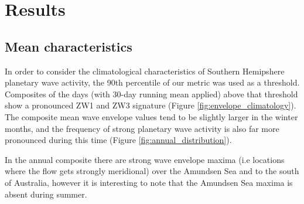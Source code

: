 \section{Results}

\subsection{Mean characteristics}

In order to consider the climatological characteristics of Southern Hemipshere planetary wave activity, the 90th percentile of our metric was used as a threshold. Composites of the days (with 30-day running mean applied) above that threshold show a pronounced ZW1 and ZW3 signature (Figure \ref{fig:envelope_climatology}). The composite mean wave envelope values tend to be slightly larger in the winter months, and the frequency of strong planetary wave activity is also far more pronounced during this time (Figure \ref{fig:annual_distribution}).


In the annual composite there are strong wave envelope maxima (i.e locations where the flow gets strongly meridional) over the Amundsen Sea and to the south of Australia, however it is interesting to note that the Amundsen Sea maxima is absent during summer.   



